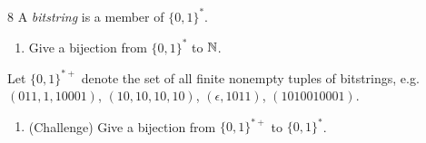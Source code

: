 \begin{exercise}{8}
    A \emph{bitstring} is a member of $\{0,1\}^*$.
    \begin{enumerate}[label=(\alph*)]
        \item Give a bijection from $\{0,1\}^*$ to $\mathbb{N}$.
    \end{enumerate}
    Let $\{0,1\}^{*+}$ denote the set of all finite nonempty tuples of
    bitstrings, e.g.\ $(011,1,10001)$, $(10,10,10,10)$, $(\epsilon,1011)$,
    $(1010010001)$.
    \begin{enumerate}[label=(\alph*),start=2]
        \item (Challenge) Give a bijection from $\{0,1\}^{*+}$ to $\{0,1\}^*$.
    \end{enumerate}
\end{exercise}
